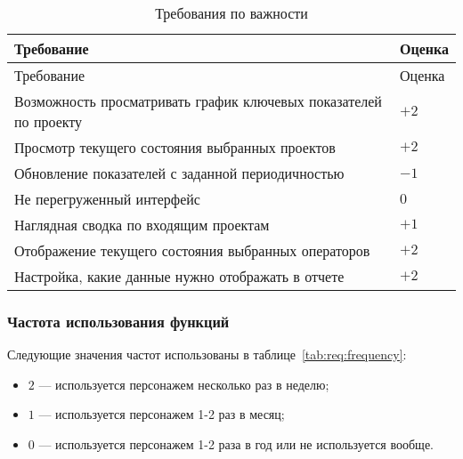 \begin{small}
\begin{longtable}{|p{}|p{}|}
\caption{Требования по важности}
\label{tab:req:importance}
\\ \hline
Требование                          & Оценка \\
\hline \endfirsthead
\hline
Требование                          & Оценка \\
\hline
\endhead
\hline \endlastfoot
Возможность просматривать график ключевых показателей по проекту & $+2$  \\
\hline
Просмотр текущего состояния выбранных проектов           & $+2$    \\
\hline
Обновление показателей с заданной периодичностью               & $-1$ \\
\hline
Не перегруженный интерфейс               & $0$ \\
\hline
Наглядная сводка по входящим проектам               & $+1$ \\
\hline
Отображение текущего состояния выбранных операторов & $+2$ \\
\hline
Настройка, какие данные нужно отображать в отчете               & $+2$ \\
\end{longtable}
\end{small}

\subsubsection{Частота использования функций}

Следующие значения частот использованы в таблице~\ref{tab:req:frequency}:
\begin{itemize}
    \item $2$ --- используется персонажем несколько раз в неделю;
    \item $1$ --- используется персонажем 1-2 раз в месяц;
    \item $0$ --- используется персонажем 1-2 раза в год или не используется вообще.
\end{itemize}

